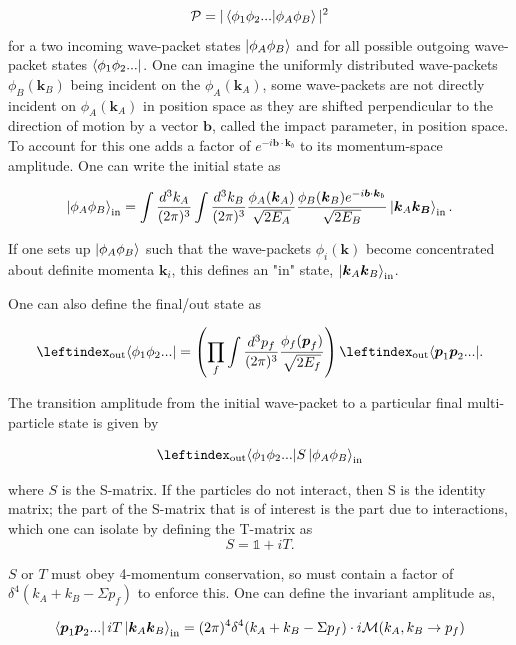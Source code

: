 \documentclass[a4paper,11pt]{article}
\begin{document}
$$\mathcal{P} = |\bra{\phi_1 \phi_2 ...}\ket{\phi_A \phi_B}|^2$$
for a two incoming wave-packet states $\ket{\phi_A \phi_B}$ and for all possible outgoing wave-packet states $\bra{\phi_1 \phi_2 ...}$. One can imagine the uniformly distributed wave-packets $\phi_B(\boldsymbol{k}_B)$ being incident on the $\phi_A(\boldsymbol{k}_A)$, some wave-packets are not directly incident on $\phi_A(\boldsymbol{k}_A)$ in position space as they are shifted perpendicular to the direction of motion by a vector $\boldsymbol{b}$, called the impact parameter, in position space. To account for this one adds a factor of $e^{-i\boldsymbol{b}\cdot \boldsymbol{k}_b}$ to its momentum-space amplitude. One can write the initial state as

\begin{equation}\label{in_states}
	\ket{\phi_A\phi_B}_\text{in} = \int \frac{d^3k_A}{(2\pi)^3} \int \frac{d^3k_B}{(2\pi)^3} \frac{\phi_A(\boldsymbol{k}_A)}{\sqrt{2E_A}}\frac{\phi_B(\boldsymbol{k}_B)e^{-i\boldsymbol{b}\cdot \boldsymbol{k}_b}}{\sqrt{2E_B}} \ket{\boldsymbol{k}_A\boldsymbol{k_B}}_\text{in}.
\end{equation}


If one sets up $\ket{\phi_A \phi_B}$ such that the wave-packets $\phi_i (\boldsymbol{k})$ become concentrated about definite momenta $\boldsymbol{k}_i$, this defines an "in" state, $\ket{\boldsymbol{k}_A\boldsymbol{k}_B}_\text{in}$.

One can also define the final/out state as

$$\leftindex_{\text{out}}{\bra{\phi_1\phi_2...}} = \left(\prod_{f} \int\frac{d^3p_f}{(2\pi)^3} \frac{\phi_f(\boldsymbol{p}_f)}{\sqrt{2E_f}}\right)\leftindex_{\text{out}}{\bra{\boldsymbol{p}_1\boldsymbol{p}_2...}}. $$

The transition amplitude from the initial wave-packet to a particular final multi-particle state is given by

$$\leftindex_{\text{out}}{\bra{\phi_1\phi_2...}}S\ket{\phi_A\phi_B}_\text{in}$$

where $S$ is the S-matrix. If the particles do not interact, then S is the identity matrix; the part of the S-matrix that is of interest is the part due to interactions, which one can isolate by defining the T-matrix as
$$S = \mathds{1} + iT.$$

$S$ or $T$ must obey 4-momentum conservation, so must contain a factor of $\delta^4(k_A + k_B - \Sigma p_f)$ to enforce this. One can define the invariant amplitude as,

\begin{equation}\label{momentum-enforce}
	\bra{\boldsymbol{p}_1 \boldsymbol{p}_2 ...}iT\ket{\boldsymbol{k}_A\boldsymbol{k}_B}_\text{in} = (2\pi)^4 \delta^4(k_A + k_B - \Sigma p_f) \cdot i\mathcal{M}(k_A, k_B \rightarrow p_f)
\end{equation}
\end{document}
